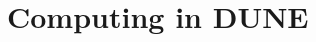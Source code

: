 %

\newcommand{\ldword}[1]{{\bf{[#1]}}\footnote{define word#1}}
\newcommand{\ldshort}[1]{{\bf{[#1]}}\footnote{define abbr #1}}
\newcommand{\ignore}[1]{}
\newcommand{\lcite}[1]{
{#1}}
\renewcommand\thedoctitle{\voltitleexec} %

%



\chapter{Computing in DUNE}
\label{ch:exec-comp}

